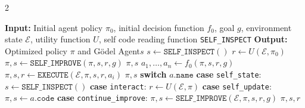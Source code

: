 \documentclass[11pt]{article}
\newcommand{\framework}{Gödel Agent\xspace}
\begin{document}
\begin{algorithm*}[t!]
\small
\caption{Recursive Self-Improvement of \framework}
\vspace{-12pt}
\label{alg:1}
\begin{multicols}{2}
\begin{algorithmic}[1]
\State \textbf{Input:} Initial agent policy $\pi_0$, initial decision function $f_0$, goal $g$, environment state $\mathcal{E}$, utility function $U$, self code reading function \texttt{SELF\_INSPECT}
\State \textbf{Output:} Optimized policy $\pi$ and \framework $s$
\State {}
\State $s \gets \texttt{SELF\_INSPECT}()$
\State {}
\State $r \gets U(\mathcal{E}, \pi_0)$
\State {}
\State $\pi, s \gets \texttt{SELF\_IMPROVE}(\pi, s, r, g)$
\State \Return $\pi, s$
\State {}
    \State {}
    \State $a_1, \ldots, a_n \gets f_0(\pi, s, r, g)$
        \State $\pi, s, r \gets \texttt{EXECUTE}(\mathcal{E}, \pi, s, r, a_i)$
    \EndFor
    \State \Return $\pi, s$
\EndFunction
\State {}
    \State \textbf{switch} $a.\texttt{name}$
    \State \quad \textbf{case} \texttt{self\_state}:
    \State \quad\quad $s \gets \texttt{SELF\_INSPECT}()$
    \State \quad \textbf{case} \texttt{interact}:
    \State \quad\quad $r \gets U(\mathcal{E}, \pi)$ 
    \State \quad \textbf{case} \texttt{self\_update}:
    \State \quad\quad $\pi, s \gets a.\texttt{code}$ 
    \State \quad \textbf{case} \texttt{continue\_improve}:
    \State \quad\quad {}
    \State \quad\quad $\pi, s \gets \texttt{SELF\_IMPROVE}(\mathcal{E}, \pi, s, r, g)$ 
    \State \Return $\pi, s, r$
\EndFunction
\vspace{-10pt}
\end{algorithmic}
\end{multicols}
\end{algorithm*}
\end{document}
